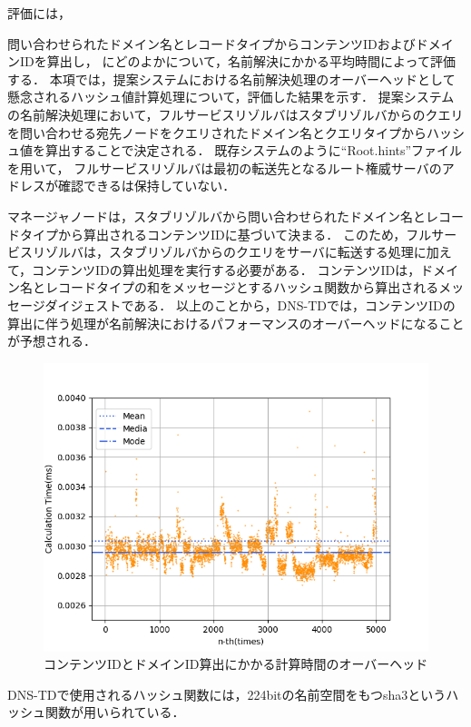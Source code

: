 評価には，

問い合わせられたドメイン名とレコードタイプからコンテンツIDおよびドメインIDを算出し，
にどのよかについて，名前解決にかかる平均時間によって評価する．
本項では，提案システムにおける名前解決処理のオーバーヘッドとして懸念されるハッシュ値計算処理について，評価した結果を示す．
提案システムの名前解決処理において，フルサービスリゾルバはスタブリゾルバからのクエリを問い合わせる宛先ノードをクエリされたドメイン名とクエリタイプからハッシュ値を算出することで決定される．
既存システムのように``Root.hints''ファイルを用いて，
フルサービスリゾルバは最初の転送先となるルート権威サーバのアドレスが確認できるは保持していない．

マネージャノードは，スタブリゾルバから問い合わせられたドメイン名とレコードタイプから算出されるコンテンツIDに基づいて決まる．
このため，フルサービスリゾルバは，スタブリゾルバからのクエリをサーバに転送する処理に加えて，コンテンツIDの算出処理を実行する必要がある．
コンテンツIDは，ドメイン名とレコードタイプの和をメッセージとするハッシュ関数から算出されるメッセージダイジェストである．
以上のことから，DNS-TDでは，コンテンツIDの算出に伴う処理が名前解決におけるパフォーマンスのオーバーヘッドになることが予想される．

\begin{figure}[h]
 \centering
 \includegraphics[scale=0.8]{figure/overhead.png}
 \caption{コンテンツIDとドメインID算出にかかる計算時間のオーバーヘッド}
 \label{fig:overhead}
\end{figure}

DNS-TDで使用されるハッシュ関数には，224bitの名前空間をもつsha3というハッシュ関数が用いられている．
\newpage
